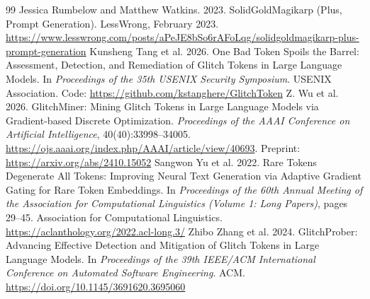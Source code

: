 \documentclass[11pt]{article}
\begin{document}
\begin{thebibliography}{99}
 Jessica Rumbelow and Matthew Watkins. 2023. SolidGoldMagikarp (Plus, Prompt Generation). LessWrong, February 2023. \url{https://www.lesswrong.com/posts/aPeJE8bSo6rAFoLqg/solidgoldmagikarp-plus-prompt-generation}
 Kunsheng Tang et al. 2026. One Bad Token Spoils the Barrel: Assessment, Detection, and Remediation of Glitch Tokens in Large Language Models. In \emph{Proceedings of the 35th USENIX Security Symposium}. USENIX Association. Code: \url{https://github.com/kstanghere/GlitchToken}
 Z. Wu et al. 2026. GlitchMiner: Mining Glitch Tokens in Large Language Models via Gradient-based Discrete Optimization. \emph{Proceedings of the AAAI Conference on Artificial Intelligence}, 40(40):33998--34005. \url{https://ojs.aaai.org/index.php/AAAI/article/view/40693}. Preprint: \url{https://arxiv.org/abs/2410.15052}
 Sangwon Yu et al. 2022. Rare Tokens Degenerate All Tokens: Improving Neural Text Generation via Adaptive Gradient Gating for Rare Token Embeddings. In \emph{Proceedings of the 60th Annual Meeting of the Association for Computational Linguistics (Volume 1: Long Papers)}, pages 29--45. Association for Computational Linguistics. \url{https://aclanthology.org/2022.acl-long.3/}
 Zhibo Zhang et al. 2024. GlitchProber: Advancing Effective Detection and Mitigation of Glitch Tokens in Large Language Models. In \emph{Proceedings of the 39th IEEE/ACM International Conference on Automated Software Engineering}. ACM. \url{https://doi.org/10.1145/3691620.3695060}
\end{thebibliography}
\end{document}
